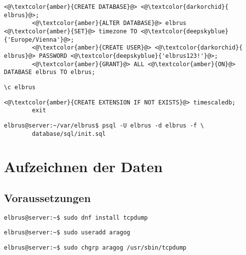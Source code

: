 \documentclass{article}
\begin{document}
	\lstset{style=files}
	\begin{lstlisting}[caption={Auführen von SQL Befehlen.}, numbers=none]
		<@\textcolor{amber}{CREATE DATABASE}@> <@\textcolor{darkorchid}{ elbrus}@>;
		<@\textcolor{amber}{ALTER DATABASE}@> elbrus <@\textcolor{amber}{SET}@> timezone TO <@\textcolor{deepskyblue}{'Europe/Vienna'}@>;
		<@\textcolor{amber}{CREATE USER}@> <@\textcolor{darkorchid}{ elbrus}@> PASSWORD <@\textcolor{deepskyblue}{'elbrus123!'}@>;
		<@\textcolor{amber}{GRANT}@> ALL <@\textcolor{amber}{ON}@> DATABASE elbrus TO elbrus;
	\end{lstlisting}
	
	\begin{lstlisting}[caption={Wechseln zu erstellter Datenbank.}, numbers=none]
		\c elbrus
	\end{lstlisting}

	\begin{lstlisting}[caption={Hinzufügen der TimescaleDB Erweiterung.}, numbers=none]
		<@\textcolor{amber}{CREATE EXTENSION IF NOT EXISTS}@> timescaledb;
		exit
	\end{lstlisting}

	\lstset{style=commands}
	\begin{lstlisting}[caption={Anlegen der benötigten Tabellen duch das ausführen von 'init.sql'.}]
		elbrus@server:~/var/elbrus$ psql -U elbrus -d elbrus -f \
		database/sql/init.sql
	\end{lstlisting}
	
	\newpage
	
	\section{Aufzeichnen der Daten}
	\subsection{Voraussetzungen}
	\lstset{style=commands}
	\begin{lstlisting}[caption={Installieren von 'tcpdump' für das aufzeichnen von Daten.}]
		elbrus@server:~$ sudo dnf install tcpdump
	\end{lstlisting}

	\begin{lstlisting}[caption={Anlegen eines Users der Berechtigungen zum ausführen von 'tcpdump' erhält.}]
		elbrus@server:~$ sudo useradd aragog
	\end{lstlisting}
	
	\begin{lstlisting}[caption={Zuweisen von 'tcpdump' zu der Gruppe 'aragog'.}]
		elbrus@server:~$ sudo chgrp aragog /usr/sbin/tcpdump
	\end{lstlisting}
	
\end{document}
